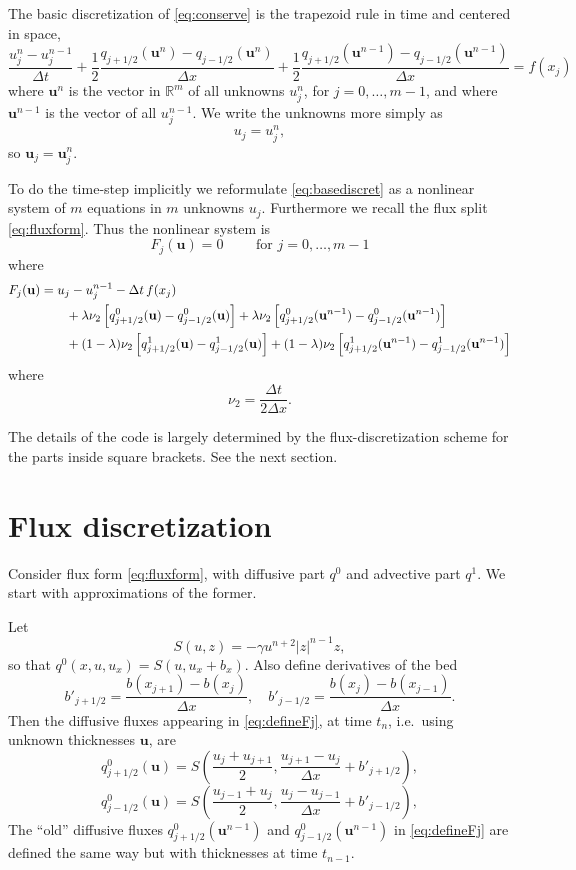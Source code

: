 \documentclass[11pt]{amsart}
\newcommand\bu{\mathbf{u}}
\newcommand\RR{\mathbb{R}}
\begin{document}
The basic discretization of \eqref{eq:conserve} is the trapezoid rule in time and centered in space,
\begin{equation}
\frac{u_j^n - u_j^{n-1}}{\Delta t} + \frac{1}{2} \frac{q_{j+1/2}(\bu^n) - q_{j-1/2}(\bu^n)}{\Delta x} + \frac{1}{2} \frac{q_{j+1/2}(\bu^{n-1}) - q_{j-1/2}(\bu^{n-1})}{\Delta x} = f(x_j) \label{eq:basediscret}
\end{equation}
where $\bu^n$ is the vector in $\RR^m$ of all unknowns $u_j^n$, for $j=0,\dots,m-1$, and where $\bu^{n-1}$ is the vector of all $u_j^{n-1}$.  We write the unknowns more simply as
  $$u_j = u_j^n,$$
so $\bu_j = \bu_j^n$.

To do the time-step implicitly we reformulate \eqref{eq:basediscret} as a nonlinear system of $m$ equations in $m$ unknowns $u_j$.  Furthermore we recall the flux split \eqref{eq:fluxform}.  Thus the nonlinear system is
\begin{equation}
F_j(\bu) = 0 \qquad \text{ for } j = 0,\dots,m-1
\end{equation}
where
\begin{align}
F_j(\bu) &= u_j - u_j^{n-1} - \Delta t\,f(x_j)  \label{eq:defineFj} \\
   &\qquad + \lambda \nu_2 \left[q^0_{j+1/2}(\bu) - q^0_{j-1/2}(\bu)\right] + \lambda \nu_2 \left[q^0_{j+1/2}(\bu^{n-1}) - q^0_{j-1/2}(\bu^{n-1})\right] \notag \\
   &\qquad + (1-\lambda) \nu_2 \left[q^1_{j+1/2}(\bu) -  q^1_{j-1/2}(\bu)\right] + (1-\lambda) \nu_2 \left[q^1_{j+1/2}(\bu^{n-1}) - q^1_{j-1/2}(\bu^{n-1})\right] \notag
\end{align}
where
    $$\nu_2 = \frac{\Delta t}{2\Delta x}.$$

The details of the code is largely determined by the flux-discretization scheme for the parts inside square brackets.  See the next section.

\section{Flux discretization}

Consider flux form \eqref{eq:fluxform}, with diffusive part $q^0$ and advective part $q^1$.  We start with approximations of the former.

Let
	$$S(u,z) = - \gamma u^{n+2} |z|^{n-1} z,$$
so that $q^0(x,u,u_x) = S(u,u_x+b_x)$.  Also define derivatives of the bed
	$$b'_{j+1/2} = \frac{b(x_{j+1}) - b(x_j)}{\Delta x}, \quad b'_{j-1/2} = \frac{b(x_j) - b(x_{j-1})}{\Delta x}.$$
Then the diffusive fluxes appearing in \eqref{eq:defineFj}, at time $t_n$, i.e.~using unknown thicknesses $\bu$, are
    $$q^0_{j+1/2}(\bu) = S\left(\frac{u_j+u_{j+1}}{2},\frac{u_{j+1}-u_j}{\Delta x} + b'_{j+1/2}\right),$$
    $$q^0_{j-1/2}(\bu) = S\left(\frac{u_{j-1}+u_j}{2},\frac{u_j-u_{j-1}}{\Delta x} + b'_{j-1/2}\right),$$
The ``old'' diffusive fluxes $q^0_{j+1/2}(\bu^{n-1})$ and $q^0_{j-1/2}(\bu^{n-1})$ in \eqref{eq:defineFj} are defined the same way but with thicknesses at time $t_{n-1}$.
\end{document}
